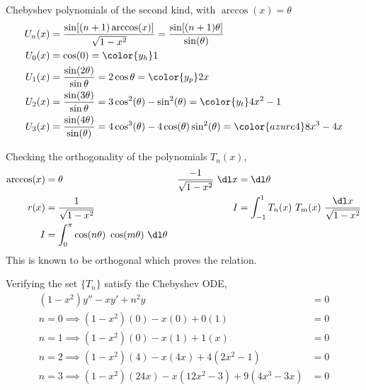 \begin{enumerate}
\begin{enumerate}
                    Chebyshev polynomials of the second kind, with
                    $ \arccos(x) = \theta $
                    \begin{align}
                        U_n(x) & = \frac{\sin[(n+1)\arccos(x)]}{\sqrt{1 - x^2}}
                        = \frac{\sin[(n+1)\theta]}{\sin(\theta)}                \\
                        U_0(x) & = \cos(0) = \color{y_h} 1                      \\
                        U_1(x) & = \frac{\sin(2\theta)}{\sin \theta}
                        = 2\cos \theta = \color{y_p} 2x                         \\
                        U_2(x) & = \frac{\sin(3\theta)}{\sin\theta} =
                        3\cos^2(\theta) - \sin^2(\theta)
                        = \color{y_t} 4x^2 - 1                                  \\
                        U_3(x) & = \frac{\sin(4\theta)}{\sin(\theta)}
                        = 4\cos^3(\theta) - 4\cos(\theta) \sin^2(\theta)
                        = \color{azure4} 8x^3 - 4x
                    \end{align}

                    Checking the orthogonality of the polynomials $ T_n(x) $,
                    \begin{align}
                        \arccos(x)                       & = \theta               &
                        \frac{-1}{\sqrt{1 - x^2}}\ \dl x & = \dl \theta             \\
                        r(x)                             & = \frac{1}
                        {\sqrt{1 - x^2}}                 &
                        I                                & = \int_{-1}^{1} T_n(x)
                        \ T_m(x)\ \frac{\dl x}{\sqrt{1 - x^2}}                      \\
                        I                                & = \int_{0}^{\pi}
                        \cos(n\theta)\ \cos(m\theta)\ \dl \theta
                    \end{align}
                    This is known to be orthogonal which proves the relation. \par
                    Verifying the set $ \{T_n\} $ satisfy the Chebyshev ODE,
                    \begin{align}
                        (1 - x^2)y'' - xy' + n^2y                       & = 0 \\
                        n = 0 \implies (1-x^2)(0) - x(0) + 0(1)         & = 0 \\
                        n = 1 \implies (1-x^2)(0) - x(1) + 1(x)         & = 0 \\
                        n = 2 \implies (1-x^2)(4) - x(4x) + 4(2x^2 - 1) & = 0 \\
                        n = 3 \implies (1-x^2)(24x) - x(12x^2 - 3) +
                        9(4x^3 - 3x)                                    & = 0
                    \end{align}


\end{enumerate}
\end{enumerate}
